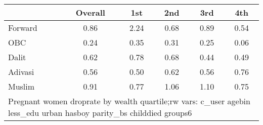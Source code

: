 \begin{tabular}{l*{5}{c}}
\toprule
            &\multicolumn{1}{c}{Overall}&\multicolumn{1}{c}{1st}&\multicolumn{1}{c}{2nd}&\multicolumn{1}{c}{3rd}&\multicolumn{1}{c}{4th}\\
\midrule
\midrule
Forward     &        0.86&        2.24&        0.68&        0.89&        0.54\\
OBC         &        0.24&        0.35&        0.31&        0.25&        0.06\\
Dalit       &        0.62&        0.78&        0.68&        0.44&        0.49\\
Adivasi     &        0.56&        0.50&        0.62&        0.56&        0.76\\
Muslim      &        0.91&        0.77&        1.06&        1.10&        0.75\\
\bottomrule
\multicolumn{6}{l}{\footnotesize Pregnant women droprate by wealth quartile;\n rw vars: c\_user agebin less\_edu urban hasboy parity\_bs childdied groups6}\\
\end{tabular}
